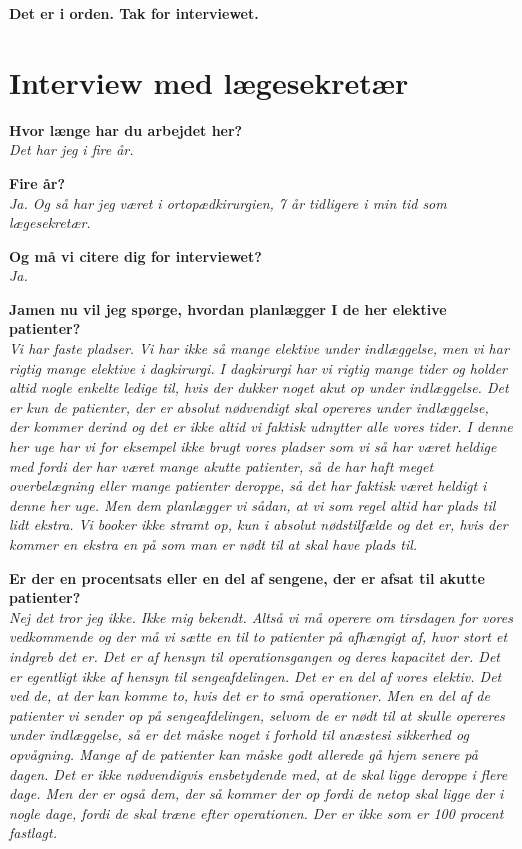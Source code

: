 \textbf{Det er i orden. Tak for interviewet.} \\
\noindent


\section{Interview med lægesekretær}

\textbf{Hvor længe har du arbejdet her?} \\
\noindent
\textit{Det har jeg i fire år.}

\textbf{Fire år?} \\
\noindent
\textit{Ja. Og så har jeg været i ortopædkirurgien, 7 år tidligere i min tid som lægesekretær.}


\textbf{Og må vi citere dig for interviewet?}\\
\noindent
\textit{Ja.}


\textbf{Jamen nu vil jeg spørge, hvordan planlægger I de her elektive patienter?}\\
\noindent
\textit{Vi har faste pladser. Vi har ikke så mange elektive under indlæggelse, men vi har rigtig mange elektive i dagkirurgi. I dagkirurgi har vi rigtig mange tider og  holder altid nogle enkelte ledige til, hvis der dukker noget akut op under indlæggelse. Det er kun de patienter, der er absolut nødvendigt skal opereres under indlæggelse, der kommer derind og det er ikke altid vi faktisk udnytter alle vores tider. I denne her uge har vi for eksempel ikke brugt vores pladser som vi så har været heldige med fordi der har været mange akutte patienter, så de har haft meget overbelægning eller mange patienter deroppe, så det har faktisk været heldigt i denne her uge. Men dem planlægger vi sådan, at vi som regel altid har plads til lidt ekstra. Vi booker ikke stramt op, kun i absolut nødstilfælde og det er, hvis der kommer en ekstra en på som man er nødt til at skal have plads til.}

\textbf{Er der en procentsats eller en del af sengene, der er afsat til akutte patienter?}\\
\noindent
\textit{Nej det tror jeg ikke. Ikke mig bekendt. Altså vi må operere om tirsdagen for vores vedkommende og der må vi sætte en til to patienter på afhængigt af, hvor stort et indgreb det er. Det er af hensyn til operationsgangen og deres kapacitet der. Det er egentligt ikke af hensyn til sengeafdelingen. Det er en del af vores elektiv. Det ved de, at der kan komme to, hvis det er to små operationer. Men en del af de patienter vi sender op på sengeafdelingen, selvom de er nødt til at skulle opereres under indlæggelse, så er det måske noget i forhold til anæstesi sikkerhed og opvågning. Mange af de patienter kan måske godt allerede gå hjem senere på dagen. Det er ikke nødvendigvis ensbetydende med, at de skal ligge deroppe i flere dage. Men der er også dem, der så kommer der op fordi de netop skal ligge der i nogle dage, fordi de skal træne efter operationen. Der er ikke som er 100 procent fastlagt.} 



